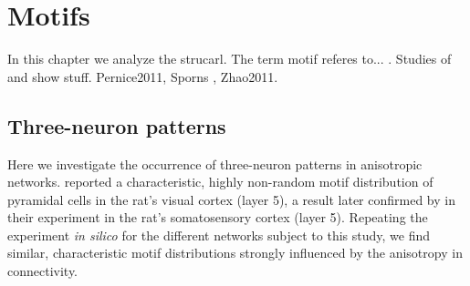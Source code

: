 

\section{Motifs}\label{sec:motifs}

In this chapter we analyze the strucarl. The term motif referes
to... . Studies of \textcite{Song2005} and \textcite{Perin2011} show
stuff. Pernice2011, Sporns , Zhao2011.

\newpage
\subsection*{Three-neuron patterns}

Here we investigate the occurrence of three-neuron patterns in
an\-iso\-tro\-pic networks. \textcite{Song2005} reported a
characteristic, highly non-ran\-dom motif distribution of pyramidal
cells in the rat's visual cortex (layer 5), a result later confirmed
by \textcite{Perin2011} in their experiment in the rat's somatosensory
cortex (layer 5). Repeating the experiment \textit{in silico} for the
different networks subject to this study, we find similar,
characteristic motif distributions strongly influenced by the
anisotropy in connectivity.

